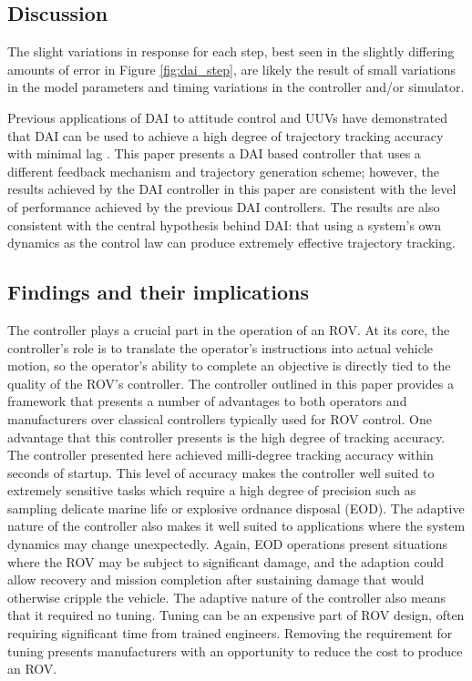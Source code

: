 \documentclass[applsci,article,submit,pdftex,moreauthors]{Definitions/mdpi}
\begin{document}
\begin{paracol}{2}
\section{Discussion}

The slight variations in response for each step, best seen in the slightly differing amounts of error in Figure \ref{fig:dai_step}, are likely the result of small variations in the model parameters and timing variations in the controller and/or simulator.

Previous applications of DAI to attitude control and UUVs have demonstrated that DAI can be used to achieve a high degree of trajectory tracking accuracy with minimal lag \cite{Sands20, Smeresky20}. This paper presents a DAI based controller that uses a different feedback mechanism and trajectory generation scheme; however, the results achieved by the DAI controller in this paper are consistent with the level of performance achieved by the previous DAI controllers. The results are also consistent with the central hypothesis behind DAI: that using a system's own dynamics as the control law can produce extremely effective trajectory tracking.

\subsection{Findings and their implications}
The controller plays a crucial part in the operation of an ROV. At its core, the controller's role is to translate the operator's instructions into actual vehicle motion, so the operator's ability to complete an objective is directly tied to the quality of the ROV's controller. The controller outlined in this paper provides a framework that presents a number of advantages to both operators and manufacturers over classical controllers typically used for ROV control. One advantage that this controller presents is the high degree of tracking accuracy. The controller presented here achieved milli-degree tracking accuracy within seconds of startup. This level of accuracy makes the controller well suited to extremely sensitive tasks which require a high degree of precision such as sampling delicate marine life or explosive ordnance disposal (EOD). The adaptive nature of the controller also makes it well suited to applications where the system dynamics may change unexpectedly. Again, EOD operations present situations where the ROV may be subject to significant damage, and the adaption could allow recovery and mission completion after sustaining damage that would otherwise cripple the vehicle. The adaptive nature of the controller also means that it required no tuning. Tuning can be an expensive part of ROV design, often requiring significant time from trained engineers. Removing the requirement for tuning presents manufacturers with an opportunity to reduce the cost to produce an ROV.


\end{paracol}
\end{document}

